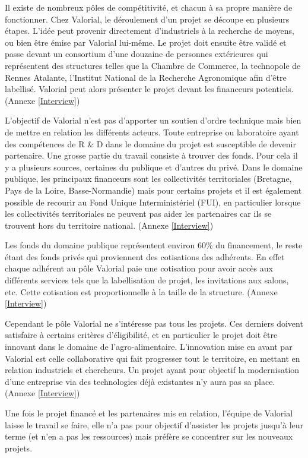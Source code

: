 \documentclass[a4paper,12pt]{report}
\begin{document}
			 Il existe de nombreux pôles de compétitivité, et chacun à sa propre manière de fonctionner. Chez Valorial, le déroulement d’un projet se découpe en plusieurs étapes. L’idée peut provenir directement d’industriels à la recherche de moyens, ou bien être émise par Valorial lui-même. Le projet doit ensuite être validé et passe devant un consortium d’une douzaine de personnes extérieures qui représentent des structures telles que la Chambre de Commerce, la technopole de Rennes Atalante, l’Institut National de la Recherche Agronomique afin d’être labellisé. Valorial peut alors présenter le projet devant les financeurs potentiels. (Annexe \ref{Interview})

			L’objectif de Valorial n’est pas d’apporter un soutien d’ordre technique mais bien de mettre en relation les différents acteurs. Toute entreprise ou laboratoire ayant des compétences de R \& D dans le domaine du projet est susceptible de devenir partenaire. Une grosse partie du travail consiste à trouver des fonds. Pour cela il y a plusieurs sources, certaines du publique et d’autres du privé. Dans le domaine publique, les principaux financeurs sont les collectivités territoriales (Bretagne, Pays de la Loire, Basse-Normandie) mais pour certains projets et il est également possible de recourir au Fond Unique Interministériel (FUI), en particulier lorsque les collectivités territoriales ne peuvent pas aider les partenaires car ils se trouvent hors du territoire national. (Annexe \ref{Interview})

			Les fonds du domaine publique représentent environ 60\% du financement, le reste étant des fonds privés qui proviennent des cotisations des adhérents. En effet chaque adhérent au pôle Valorial paie une cotisation pour avoir accès aux différents services tels que la labellisation de projet, les invitations aux salons, etc. Cette cotisation est proportionnelle à la taille de la structure.  (Annexe \ref{Interview})
    
    			Cependant le pôle Valorial ne s’intéresse pas tous les projets. Ces derniers doivent satisfaire à certains critères d'éligibilité, et en particulier le projet doit être innovant dans le domaine de l’agro-alimentaire. L’innovation mise en avant par Valorial est celle collaborative qui fait progresser tout le territoire, en mettant en relation industriels et chercheurs. Un projet ayant pour objectif la modernisation d’une entreprise via des technologies déjà existantes n’y aura pas sa place. (Annexe \ref{Interview})

    			Une fois le projet financé et les partenaires mis en relation, l’équipe de Valorial laisse le travail se faire, elle n’a pas pour objectif d’assister les projets jusqu’à leur terme (et n’en a pas les ressources) mais préfère se concentrer sur les nouveaux projets.
				
\end{document}

